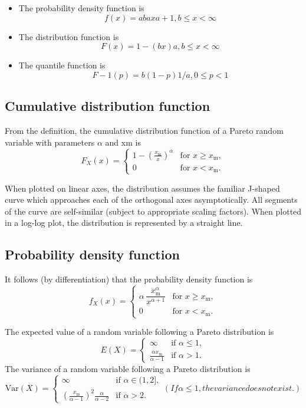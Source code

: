 \documentclass[]{report}
\begin{document}

\begin{itemize}
\item The probability density function is
\[ f(x)=abaxa+1,b\leq x< \infty \]
\item The distribution function is
\[F(x)=1-(bx)a,b\leq x< \infty \]


\item The quantile function is
\[F-1(p)=b(1-p)1/a,0\leq p<1\]
\end{itemize}


\subsection{Cumulative distribution function}
From the definition, the cumulative distribution function of a Pareto random variable with parameters $\alpha$ and xm is
\[F_X(x) = \begin{cases}
1-\left(\frac{x_\mathrm{m}}{x}\right)^\alpha & \mbox{for } x \ge x_\mathrm{m}, \\
0 & \mbox{for }x < x_\mathrm{m}.
\end{cases}
\]


When plotted on linear axes, the distribution assumes the familiar J-shaped curve which approaches each of the orthogonal axes asymptotically. All segments of the curve are self-similar (subject to appropriate scaling factors). When plotted in a log-log plot, the distribution is represented by a straight line.
\subsection{Probability density function}
It follows (by differentiation) that the probability density function is
\[
f_X(x)= \begin{cases} \alpha\,\dfrac{x_\mathrm{m}^\alpha}{x^{\alpha+1}} & \mbox{for }x \ge x_\mathrm{m}, \\[12pt] 0 & \mbox{for } x < x_\mathrm{m}. \end{cases} 
\]



The expected value of a random variable following a Pareto distribution is
\[
E(X)= \begin{cases} \infty & \text{if }\alpha\le 1, \\ \frac{\alpha x_\mathrm{m}}{\alpha-1} & \text{if }\alpha>1. \end{cases}
\]
The variance of a random variable following a Pareto distribution is
\[
\mathrm{Var}(X)= \begin{cases} \infty & \text{if }\alpha\in(1,2], \\ \left(\frac{x_\mathrm{m}}{\alpha-1}\right)^2 \frac{\alpha}{\alpha-2} & \text{if }\alpha>2. \end{cases}
(If \alpha\le 1, the variance does not exist.)
\]
\end{document}
